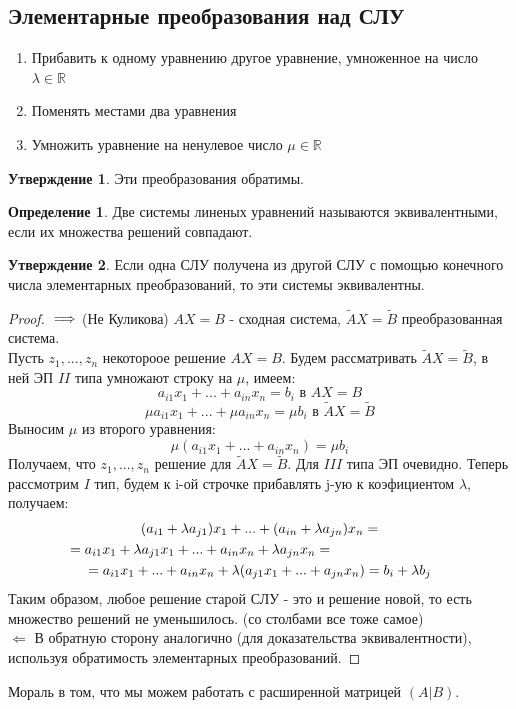\documentclass[a4paper, 12pt]{article}
\newcommand{\R}{\mathbb R}
\newcommand\tab[1][.5cm]{\hspace*{#1}}
\theoremstyle{definition}
\newtheorem*{definition}{Определение}
\newtheorem*{subtheorem}{Утверждение}
\begin{document}
    \subsection{Элементарные преобразования над СЛУ}
    \begin{enumerate}
      \item Прибавить к одному уравнению другое уравнение, умноженное на число $\lambda \in \R$
      \item Поменять местами два уравнения
      \item Умножить уравнение на ненулевое число $\mu \in \R$
    \end{enumerate}
    \begin{subtheorem}
      Эти преобразования обратимы.
    \end{subtheorem}
    \begin{definition}
      Две системы линеных уравнений называются эквивалентными, если их множества решений совпадают.
    \end{definition}
    \begin{subtheorem}
      Если одна СЛУ получена из другой СЛУ с помощью конечного числа элементарных преобразований, то эти системы эквивалентны.
    \end{subtheorem}
    \begin{proof}
      $ \\ \Longrightarrow$ (Не Куликова) 
      $AX = B$ - сходная система, $\tilde{A} X = \tilde{B}$ преобразованная система. \\
      Пусть ${z_1,...,z_n}$ некотороое решение $AX = B$. Будем рассматривать $\tilde{A} X = \tilde{B}$, в ней ЭП $II$ типа умножают строку на $\mu$, имеем:
      $$a_{i1}x_1 +...+ a_{in}x_n = b_{i} \text{ в } AX = B$$
      $$\mu a_{i1}x_1 +...+\mu a_{in}x_n = \mu b_i \text{ в } \tilde{A} X = \tilde{B}$$ 
      Выносим $\mu$ из второго уравнения:
      $$\mu (a_{i1}x_1 +...+ a_{in}x_n) = \mu b_i$$
      Получаем, что ${z_1,...,z_n}$ решение для $\tilde{A} X = \tilde{B}$. Для $III$ типа ЭП очевидно. Теперь рассмотрим $I$ тип, будем к i-ой строчке прибавлять j-ую к коэфициентом $\lambda$, получаем:
      \begin{multline*}
      (a_{i1}+\lambda a_{j1})x_1 +...+(a_{in}+\lambda a_{jn})x_n = \\ = a_{i1}x_1+\lambda a_{j1}x_1 +...+a_{in}x_n+\lambda a_{jn}x_n = \tab[3cm] \\ = a_{i1}x_1 + ... + a_{in}x_n + \lambda (a_{j1}x_1 +...+ a_{jn}x_n) = b_i + \lambda b_j
      \end{multline*}
      Таким образом, любое решение старой СЛУ - это и решение новой, то есть множество
      решений не уменьшилось. (со столбами все тоже самое) \\
      $\Longleftarrow$ В обратную сторону аналогично (для доказательства эквивалентности), используя обратимость элементарных преобразований.
    \end{proof}
    Мораль в том, что мы можем работать с расширенной матрицей $(A|B)$.
\end{document}
